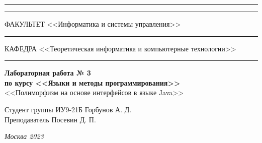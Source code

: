 \documentclass[a4paper, 14pt]{extarticle}
\begin{document}
\begin{titlepage}
\vspace{-25pt}
\hspace{-35pt}\rule{\textwidth}{2.3pt}

\vspace*{-20.3pt}
\hspace{-35pt}\rule{\textwidth}{0.4pt}

\vspace{1.5ex}
\hspace{-35pt} \noindent \small ФАКУЛЬТЕТ\hspace{80pt} <<Информатика и системы управления>>

\vspace*{-16pt}
\hspace{47pt}\rule{0.83\textwidth}{0.4pt}

\vspace{0.5ex}
\hspace{-35pt} \noindent \small КАФЕДРА\hspace{50pt} <<Теоретическая информатика и компьютерные технологии>>

\vspace*{-16pt}
\hspace{30pt}\rule{0.866\textwidth}{0.4pt}
  
\vspace{11em}

\begin{center}
\Large {\bf Лабораторная работа № 3} \\ 
\large {\bf по курсу <<Языки и методы программирования>>} \\
\large <<Полиморфизм на основе интерфейсов в языке Java>> 
\end{center}\normalsize

\vspace{8em}


\begin{flushright}
  {Студент группы ИУ9-21Б Горбунов А. Д. \hspace*{15pt}\\ 
  \vspace{2ex}
  Преподаватель Посевин Д. П.\hspace*{15pt}}
\end{flushright}

\bigskip

\vfill
 

\begin{center}
\textsl{Москва 2023}
\end{center}
\end{titlepage}
\end{document}
